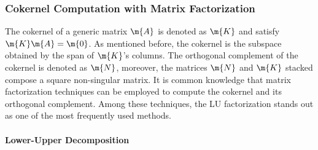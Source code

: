 \subsubsection{Cokernel Computation with Matrix Factorization}
\label{chap3:sec::cokernel}

The cokernel of a generic matrix $\m{A}$ is denoted as $\m{K}$ and satisfy $\m{K}\m{A} = \m{0}$. As mentioned before, the cokernel is the subspace obtained by the span of $\m{K}$'s columns. The orthogonal complement of the cokernel is denoted as $\m{N}$, moreover, the matrices $\m{N}$ and $\m{K}$ stacked compose a square non-singular matrix. It is common knowledge that matrix factorization techniques can be employed to compute the cokernel and its orthogonal complement. Among these techniques, the \ac{LU} factorization stands out as one of the most frequently used methods.

\paragraph{Lower-Upper Decomposition}

